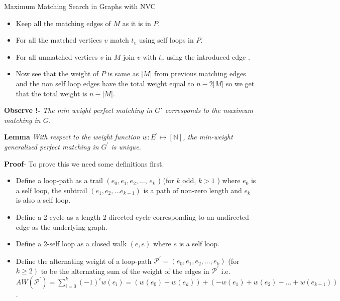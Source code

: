 \documentclass{beamer}
\begin{document}
\begin{frame}[allowframebreaks]{Maximum Matching Search in Graphs with NVC}
	\begin{itemize}
		\item Keep all the matching edges of $M$ as it  is in $P$.
		\item For all the matched  vertices $v$ match $t_v$ using self loops in $P$.
		\item For all unmatched vertices $v$ in $M$ join $v$ with $t_v$ using the introduced edge .
		\item Now see that the weight of $P$ is same as $|M|$ from previous matching edges and  the non self loop edges have the total weight equal to $n-2|M|$ so we get that the total weight is $n-|M|$.
	\end{itemize}\break
   \textbf{Observe !-} \textit{The min weight perfect matching in $G'$ corresponds to the maximum matching in $G$.}\break
   
   \textbf{Lemma} \textit{With respect to the weight function $w: E^{\prime} \mapsto[\mathbb{N}]$, the min-weight generalized perfect matching in $G^{\prime}$ is unique.}
   
   \textbf{Proof}- To prove this we need some definitions first. \begin{itemize}
   	
   \item Define a loop-path as a trail $\left(e_0, e_1, e_2, \ldots\right.$, $e_k$ ) (for $k$ odd, $k>1$ ) where $e_0$ is a self loop, the subtrail $\left(e_1, e_2, \ldots e_{k-1}\right)$ is a path of non-zero length and $e_k$ is also a self loop.
   \item Define a 2-cycle as a length 2 directed cycle corresponding to an undirected edge as the underlying graph.\item Define a 2-self loop as a closed walk $(e, e)$ where $e$ is a self loop.\item  Define the alternating weight of a loop-path $\mathcal{P}^{\prime}=\left(e_0, e_1, e_2, \ldots, e_k\right)$ (for $\left.k \geq 2\right)$ to be the alternating sum of the weight of the edges in $\mathcal{P}^{\prime}$ i.e. $A W\left(\mathcal{P}^{\prime}\right)=\sum_{i=0}^k(-1)^i w\left(e_i\right)=\left(w\left(e_0\right)-w\left(e_k\right)\right)+\left(-w\left(e_1\right)+w\left(e_2\right)-\ldots+w\left(e_{k-1}\right)\right)$.
   

\end{itemize}
\end{frame}
\end{document}
